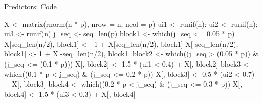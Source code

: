 \documentclass{beamer}
\newenvironment{Shaded}{\begin{snugshade}}{\end{snugshade}}
\newcommand{\DecValTok}[1]{\textcolor[rgb]{0.00,0.00,0.81}{{#1}}}
\newcommand{\FloatTok}[1]{\textcolor[rgb]{0.00,0.00,0.81}{{#1}}}
\newcommand{\SpecialCharTok}[1]{\textcolor[rgb]{0.00,0.00,0.00}{{#1}}}
\newcommand{\OtherTok}[1]{\textcolor[rgb]{0.56,0.35,0.01}{{#1}}}
\newcommand{\FunctionTok}[1]{\textcolor[rgb]{0.00,0.00,0.00}{{#1}}}
\newcommand{\AttributeTok}[1]{\textcolor[rgb]{0.77,0.63,0.00}{{#1}}}
\newcommand{\NormalTok}[1]{{#1}}
\begin{document}
\begin{frame}[fragile]{Predictors: Code}
\protect\hypertarget{predictors-code}{}
\begin{Shaded}
\begin{Highlighting}[]
\NormalTok{  X }\OtherTok{\textless{}{-}} \FunctionTok{matrix}\NormalTok{(}\FunctionTok{rnorm}\NormalTok{(n }\SpecialCharTok{*}\NormalTok{ p), }\AttributeTok{nrow =}\NormalTok{ n, }\AttributeTok{ncol =}\NormalTok{ p)}
\NormalTok{  ui1 }\OtherTok{\textless{}{-}} \FunctionTok{runif}\NormalTok{(n); ui2 }\OtherTok{\textless{}{-}} \FunctionTok{runif}\NormalTok{(n); ui3 }\OtherTok{\textless{}{-}} \FunctionTok{runif}\NormalTok{(n)}
\NormalTok{  j\_seq }\OtherTok{\textless{}{-}} \FunctionTok{seq\_len}\NormalTok{(p)}
\NormalTok{  block1 }\OtherTok{\textless{}{-}} \FunctionTok{which}\NormalTok{(j\_seq }\SpecialCharTok{\textless{}=} \FloatTok{0.05} \SpecialCharTok{*}\NormalTok{ p)}
\NormalTok{  X[}\FunctionTok{seq\_len}\NormalTok{(n}\SpecialCharTok{/}\DecValTok{2}\NormalTok{), block1] }\OtherTok{\textless{}{-}} \SpecialCharTok{{-}}\DecValTok{1} \SpecialCharTok{+}\NormalTok{ X[}\FunctionTok{seq\_len}\NormalTok{(n}\SpecialCharTok{/}\DecValTok{2}\NormalTok{), block1]}
\NormalTok{  X[}\SpecialCharTok{{-}}\FunctionTok{seq\_len}\NormalTok{(n}\SpecialCharTok{/}\DecValTok{2}\NormalTok{), block1] }\OtherTok{\textless{}{-}} \DecValTok{1} \SpecialCharTok{+}\NormalTok{ X[}\SpecialCharTok{{-}}\FunctionTok{seq\_len}\NormalTok{(n}\SpecialCharTok{/}\DecValTok{2}\NormalTok{), block1]}
\NormalTok{  block2 }\OtherTok{\textless{}{-}} \FunctionTok{which}\NormalTok{((j\_seq }\SpecialCharTok{\textgreater{}}\NormalTok{ (}\FloatTok{0.05} \SpecialCharTok{*}\NormalTok{ p)) }\SpecialCharTok{\&}\NormalTok{ (j\_seq }\SpecialCharTok{\textless{}=}\NormalTok{ (}\FloatTok{0.1} \SpecialCharTok{*}\NormalTok{ p)))}
\NormalTok{  X[, block2] }\OtherTok{\textless{}{-}} \FloatTok{1.5} \SpecialCharTok{*}\NormalTok{ (ui1 }\SpecialCharTok{\textless{}} \FloatTok{0.4}\NormalTok{) }\SpecialCharTok{+}\NormalTok{ X[, block2]}
\NormalTok{  block3 }\OtherTok{\textless{}{-}} \FunctionTok{which}\NormalTok{((}\FloatTok{0.1} \SpecialCharTok{*}\NormalTok{ p }\SpecialCharTok{\textless{}}\NormalTok{ j\_seq) }\SpecialCharTok{\&}\NormalTok{ (j\_seq }\SpecialCharTok{\textless{}=} \FloatTok{0.2} \SpecialCharTok{*}\NormalTok{ p))}
\NormalTok{  X[, block3] }\OtherTok{\textless{}{-}} \FloatTok{0.5} \SpecialCharTok{*}\NormalTok{ (ui2 }\SpecialCharTok{\textless{}} \FloatTok{0.7}\NormalTok{) }\SpecialCharTok{+}\NormalTok{ X[, block3]}
\NormalTok{  block4 }\OtherTok{\textless{}{-}} \FunctionTok{which}\NormalTok{((}\FloatTok{0.2} \SpecialCharTok{*}\NormalTok{ p }\SpecialCharTok{\textless{}}\NormalTok{ j\_seq) }\SpecialCharTok{\&}\NormalTok{ (j\_seq }\SpecialCharTok{\textless{}=} \FloatTok{0.3} \SpecialCharTok{*}\NormalTok{ p))}
\NormalTok{  X[, block4] }\OtherTok{\textless{}{-}} \FloatTok{1.5} \SpecialCharTok{*}\NormalTok{ (ui3 }\SpecialCharTok{\textless{}} \FloatTok{0.3}\NormalTok{) }\SpecialCharTok{+}\NormalTok{ X[, block4]}
\end{Highlighting}
\end{Shaded}
\end{frame}
\end{document}
